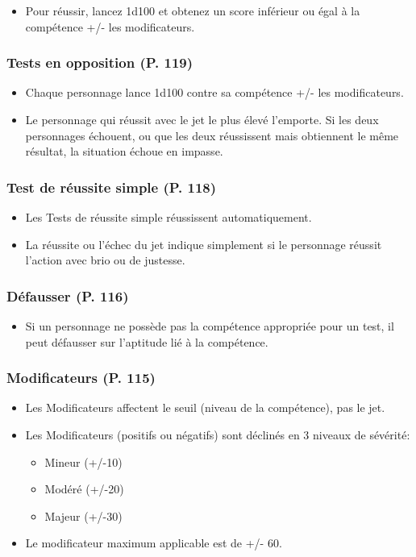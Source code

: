 \begin{itemize} \item Pour réussir, lancez 1d100 et obtenez un score inférieur ou égal à la compétence +/- les modificateurs. \end{itemize} 

\subsubsection{Tests en opposition (P. 119)} 

\begin{itemize} \item Chaque personnage lance 1d100 contre sa compétence +/- les modificateurs. \item Le personnage qui réussit avec le jet le plus élevé l'emporte. Si les deux personnages échouent, ou que les deux réussissent mais obtiennent le même résultat, la situation échoue en impasse. \end{itemize} 

\subsubsection{Test de réussite simple (P. 118)} 

\begin{itemize} \item Les Tests de réussite simple réussissent automatiquement. \item La réussite ou l'échec du jet indique simplement si le personnage réussit l'action avec brio ou de justesse. \end{itemize} 

\subsubsection{Défausser (P. 116)} 

\begin{itemize} \item Si un personnage ne possède pas la compétence appropriée pour un test, il peut défausser sur l'aptitude lié à la compétence. \end{itemize} 

\subsubsection{Modificateurs (P. 115)} 

\begin{itemize} \item Les Modificateurs affectent le seuil (niveau de la compétence), pas le jet. \item Les Modificateurs (positifs ou négatifs) sont déclinés en 3 niveaux de sévérité: \begin{itemize} \item Mineur (+/-10) \item Modéré (+/-20) \item Majeur (+/-30) \end{itemize} \item Le modificateur maximum applicable est de +/- 60. \end{itemize} 

